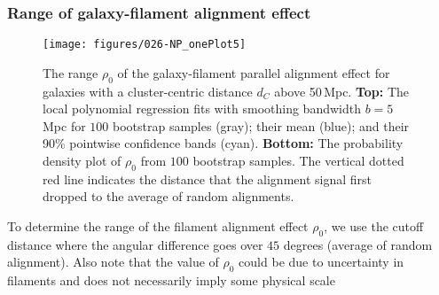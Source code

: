 \documentclass[usenatbib,useAMS]{mnras}
\theoremstyle{remark}
\newcommand{\sukhdeep}[1]{{\textcolor{magenta}{SS: #1}}}
\newcommand{\rachel}[1]{{\textcolor{cyan}{RM: #1}}}
\newcommand{\jab}[1]{{\textcolor{red}{JAB: #1}}}
\newcommand{\YC}[1]{{\textcolor{blue}{YC: #1}}}
\begin{document}
\subsubsection{Range of galaxy-filament alignment effect}
\label{sec::effect_radius}

\begin{figure}
\center
\texttt{[image: figures/026-NP\_onePlot5]}
\caption{The range $\rho_0$ of the galaxy-filament parallel alignment effect for galaxies with a
  cluster-centric distance $d_C$ above 50\,Mpc. %
{\bf Top:} The local polynomial regression fits with smoothing bandwidth $b=5$ Mpc for $100$ bootstrap samples (gray); their mean (blue); and their 90\% pointwise confidence bands (cyan).
{\bf Bottom:} The probability density plot of $\rho_0$ from $100$ bootstrap samples.
The vertical dotted red line indicates the distance that the alignment signal first dropped to the average of random alignments.
}
\label{fig::NP1}
\end{figure}

To determine the range of the filament alignment effect $\rho_0$,
we use
the cutoff distance where the 
angular difference goes over $45$ degrees (average of random alignment). 
Also note that  the value of $\rho_0$ could be due to uncertainty in filaments and does not necessarily imply some physical scale


\end{document}
